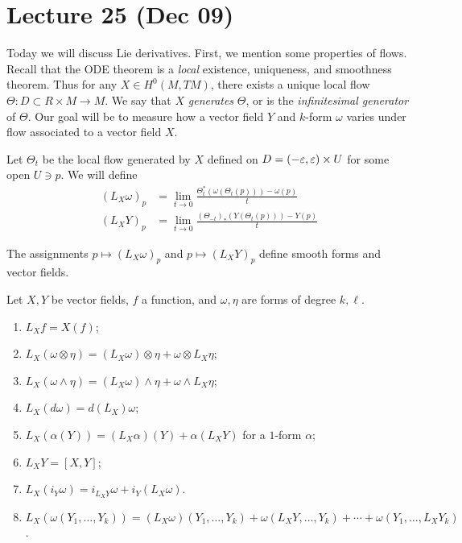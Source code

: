 \documentclass[twoside, 10pt]{article}
\begin{document}
    \section{Lecture 25 (Dec 09)}%
    \label{sec:lecture_25_dec_09_}
    
    Today we will discuss Lie derivatives. First, we mention some properties of flows. Recall that the ODE theorem is a \textit{local} existence, uniqueness, and smoothness theorem. Thus for any $X \in H^0(M, TM)$, there exists a unique local flow $\Theta: D \subset R \times M \to M$. We say that $X$ \textit{generates} $\Theta$, or is the \textit{infinitesimal generator} of $\Theta$. Our goal will be to measure how a vector field $Y$ and $k$-form $\omega$ varies under flow associated to a vector field $X$.

    Let $\Theta_t$ be the local flow generated by $X$ defined on $D = (-\varepsilon, \varepsilon) \times U$ for some open $U \ni p$. We will define
    \begin{align*}
        (L_X \omega)_p &= \lim_{t \to 0} \frac{\Theta_t^*(\omega(\Theta_t(p))) - \omega(p)}{t} \\
        (L_X Y)_p &= \lim_{t \to 0} \frac{(\Theta_{-t})_*(Y(\Theta_t(p))) - Y(p)}{t}
    \end{align*}
    
    \begin{lem}
        The assignments $p \mapsto (L_X \omega)_p$ and $p \mapsto (L_X Y)_p$ define smooth forms and vector fields.
    \end{lem}

    \begin{prop}
        Let $X, Y$ be vector fields, $f$ a function, and $\omega, \eta$ are forms of degree $k, \ell$.
        \begin{enumerate}
            \item $L_X f = X(f)$;
            \item $L_X(\omega \otimes \eta) = (L_X \omega) \otimes \eta + \omega \otimes L_X \eta$;
            \item $L_X (\omega \wedge \eta) = (L_X \omega) \wedge \eta + \omega \wedge L_X \eta$;
            \item $L_X(d\omega) = d(L_X)\omega$;
            \item $L_X(\alpha(Y)) = (L_X \alpha)(Y) + \alpha(L_X Y)$ for a $1$-form $\alpha$;
            \item $L_X Y = [X,Y]$;
            \item $L_X(i_Y \omega) = i_{L_X Y} \omega + i_Y(L_X \omega)$.
            \item $L_X(\omega(Y_1, \ldots, Y_k)) = (L_X \omega)(Y_1, \ldots, Y_k) + \omega(L_X Y, \ldots, Y_k) + \cdots + \omega(Y_1, \ldots, L_X Y_k)$.
        \end{enumerate}
    \end{prop}
\end{document}
